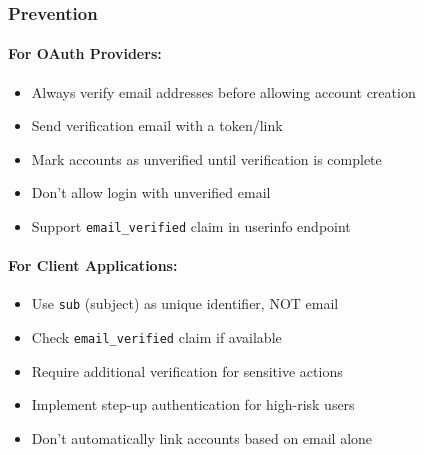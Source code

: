\documentclass[12pt,a4paper]{article}
\begin{document}
\subsubsection{Prevention}
\paragraph{For OAuth Providers:}
\begin{itemize}
    \item Always verify email addresses before allowing account creation
    \item Send verification email with a token/link
    \item Mark accounts as unverified until verification is complete
    \item Don't allow login with unverified email
    \item Support \texttt{email\_verified} claim in userinfo endpoint
\end{itemize}

\paragraph{For Client Applications:}
\begin{itemize}
    \item Use \texttt{sub} (subject) as unique identifier, NOT email
    \item Check \texttt{email\_verified} claim if available
    \item Require additional verification for sensitive actions
    \item Implement step-up authentication for high-risk users
    \item Don't automatically link accounts based on email alone
\end{itemize}
\end{document}
